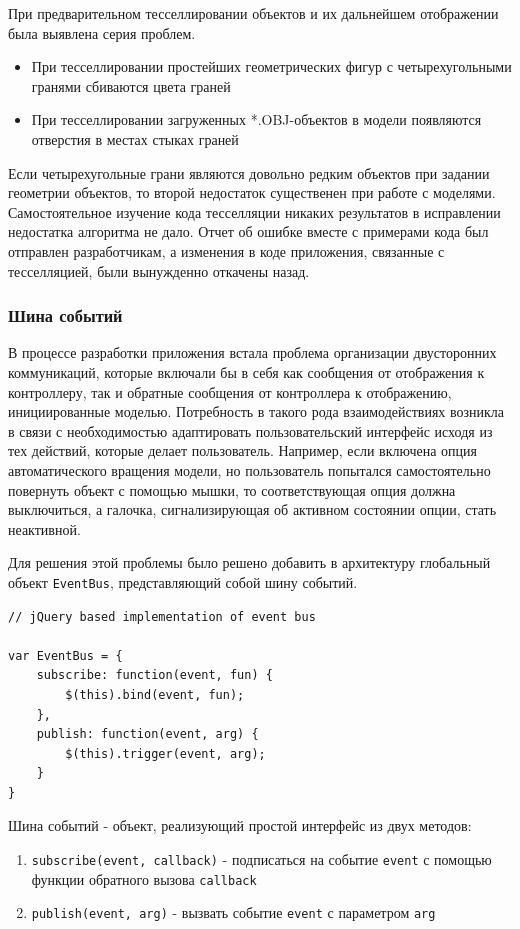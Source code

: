 \documentclass[12pt, a4paper]{article}
\begin{document}
При предварительном тесселлировании объектов и их дальнейшем отображении была
выявлена серия проблем.

\begin{itemize}
    \item При тесселлировании простейших геометрических фигур с четырехугольными
    гранями сбиваются цвета граней
    \item При тесселлировании загруженных *.OBJ-объектов в модели появляются
    отверстия в местах стыках граней
\end{itemize}

Если четырехугольные грани являются довольно редким объектов при задании
геометрии объектов, то второй недостаток существенен при работе с моделями.
Самостоятельное изучение кода тесселляции никаких результатов в
исправлении недостатка алгоритма не дало. Отчет об ошибке вместе с примерами
кода был отправлен разработчикам, а изменения в коде приложения,
связанные с тесселляцией, были вынужденно откачены назад.

\subsubsection{Шина событий}

В процессе разработки приложения встала проблема организации двусторонних
коммуникаций,
которые включали бы в себя как сообщения от отображения к контроллеру, так и
обратные сообщения от контроллера к отображению, инициированные моделью.
Потребность в такого рода взаимодействиях возникла в связи с необходимостью
адаптировать пользовательский интерфейс исходя из тех действий, которые делает
пользователь. Например, если включена опция автоматического вращения модели,
но пользователь попытался самостоятельно повернуть объект с помощью мышки, то
соответствующая опция должна выключиться, а галочка, сигнализирующая об активном
состоянии опции, стать неактивной.

Для решения этой проблемы было решено добавить в архитектуру глобальный объект
\texttt{EventBus}, представляющий собой шину событий.

\begin{lstlisting}
// jQuery based implementation of event bus

var EventBus = {
    subscribe: function(event, fun) {
        $(this).bind(event, fun);
    },
    publish: function(event, arg) {
        $(this).trigger(event, arg);
    }
}
\end{lstlisting}

Шина событий - объект, реализующий простой интерфейс из двух методов:
\begin{enumerate}
    \item \texttt{subscribe(event, callback)} - подписаться на событие
    \texttt{event} с помощью функции обратного вызова \texttt{callback}
    \item \texttt{publish(event, arg)} - вызвать событие
    \texttt{event} с параметром \texttt{arg}
\end{enumerate}
\end{document}
